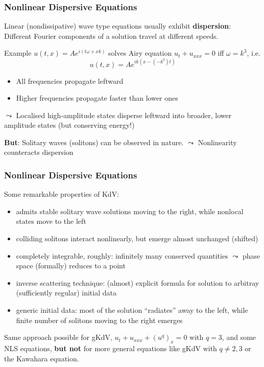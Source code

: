 \documentclass[pdftex,10pt,intlimits]{beamer}
\begin{document}
\begin{frame}
  \frametitle{Nonlinear Dispersive Equations}
Linear (nondissipative) wave type equations usually exhibit  {\bf dispersion}:\\
\vspace{0.15cm}
\hspace{0.25cm} Different Fourier components of a solution travel at different speeds.\\
\vspace{0.15cm}
\begin{block}{Example}
$u(t,x)=Ae^{i(t\omega + xk)}$ solves Airy equation $u_t + u_{xxx} = 0$ iff $\omega =
k^3$, i.e.$$u(t,x)=Ae^{ik(x -  (-k^2)t)}$$
\vspace{-0.5cm}
\begin{itemize}
 \item All frequencies propagate leftward
 \item Higher frequencies propagate faster than lower ones
\end{itemize}
$\leadsto$ Localised high-amplitude states disperse leftward into broader, lower amplitude states (but conserving
energy!)
\end{block}
\vspace{0.25cm}
{\bf But}: Solitary waves (solitons) can be observed in nature. $\leadsto$ Nonlinearity counteracts
dispersion
\end{frame}

\begin{frame}
  \frametitle{Nonlinear Dispersive Equations}
Some remarkable properties of KdV:
\begin{itemize}
 \item admits stable solitary wave solutions moving to the right, while nonlocal states move to the left
 \item colliding solitons interact nonlinearly, but emerge almost unchanged (shifted)
 \item completely integrable, roughly: infinitely many conserved quantities $\leadsto$ phase space (formally) reduces to
a point
 \item inverse scattering technique: (almost) explicit formula for solution to arbitray (sufficiently regular) initial
data
 \item generic initial data: most of the solution ``radiates'' away to the left, while finite number of solitons moving
to the right emerges
\end{itemize}
Same approach possible for gKdV, $u_t + u_{xxx} + (u^q)_x = 0$ with $q=3$, and some NLS equations, {\bf but
not} for more general equations like gKdV with $q\not=2,3$ or the Kawahara equation.
\end{frame}
\end{document}
